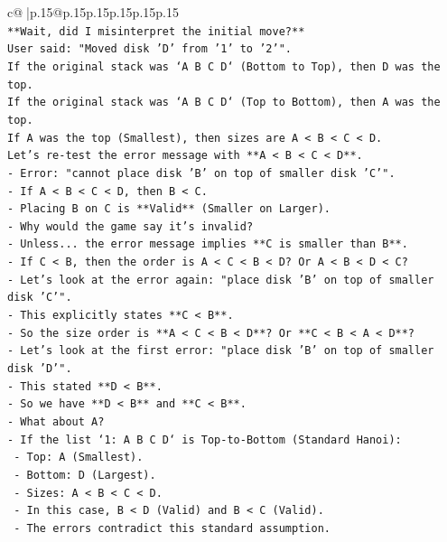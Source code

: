 \documentclass{article}
\begin{document}
{\begin{supertabular}{c@{$\;$}|p{.15\linewidth}@{}p{.15\linewidth}p{.15\linewidth}p{.15\linewidth}p{.15\linewidth}p{.15\linewidth}}
{{{\\ 
\texttt{**Wait, did I misinterpret the initial move?**} \\
\texttt{User said: "Moved disk 'D' from '1' to '2'".} \\
\texttt{If the original stack was `A B C D` (Bottom to Top), then D was the top.} \\
\texttt{If the original stack was `A B C D` (Top to Bottom), then A was the top.} \\
\texttt{If A was the top (Smallest), then sizes are A < B < C < D.} \\
\texttt{Let's re{-}test the error message with **A < B < C < D**.} \\
\texttt{{-} Error: "cannot place disk 'B' on top of smaller disk 'C'".} \\
\texttt{{-} If A < B < C < D, then B < C.} \\
\texttt{{-} Placing B on C is **Valid** (Smaller on Larger).} \\
\texttt{{-} Why would the game say it's invalid?} \\
\texttt{{-} Unless... the error message implies **C is smaller than B**.} \\
\texttt{{-} If C < B, then the order is A < C < B < D? Or A < B < D < C?} \\
\texttt{{-} Let's look at the error again: "place disk 'B' on top of smaller disk 'C'".} \\
\texttt{{-} This explicitly states **C < B**.} \\
\texttt{{-} So the size order is **A < C < B < D**? Or **C < B < A < D**?} \\
\texttt{{-} Let's look at the first error: "place disk 'B' on top of smaller disk 'D'".} \\
\texttt{{-} This stated **D < B**.} \\
\texttt{{-} So we have **D < B** and **C < B**.} \\
\texttt{{-} What about A?} \\
\texttt{{-} If the list `1: A B C D` is Top{-}to{-}Bottom (Standard Hanoi):} \\
\texttt{  {-} Top: A (Smallest).} \\
\texttt{  {-} Bottom: D (Largest).} \\
\texttt{  {-} Sizes: A < B < C < D.} \\
\texttt{  {-} In this case, B < D (Valid) and B < C (Valid).} \\
\texttt{  {-} The errors contradict this standard assumption.} \\
}}}
\end{supertabular}}
\end{document}
